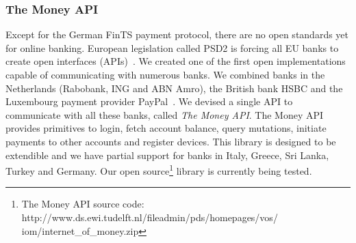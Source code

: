 \subsubsection*{The Money API}
Except for the German FinTS payment protocol, there are no open standards yet for online banking.
European legislation called PSD2 is forcing all EU banks to create open interfaces (APIs)~\cite{cortet2016psd2}.
We created one of the first open implementations capable of communicating with numerous banks. %
We combined banks in the Netherlands (Rabobank, ING and ABN Amro), the British bank HSBC and the Luxembourg payment provider PayPal~\cite{doe2015vulnerability}\cite{awesome2015vulnerability}.
We devised a single API to communicate with all these banks, called \emph{The Money API}.
The Money API provides primitives to login, fetch account balance, query mutations, initiate payments to other accounts and register devices.
This library is designed to be extendible and we have partial support for banks in Italy, Greece, Sri Lanka, Turkey and Germany.
Our open source\footnote{The Money API source code:\\http://www.ds.ewi.tudelft.nl/fileadmin/pds/homepages/vos/\\iom/internet\_of\_money.zip} library is currently being tested.


